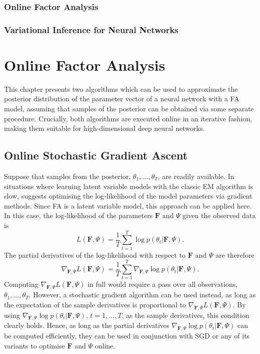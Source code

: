 \documentclass[msc,deptreport.inf]{infthesis} %
\newcommand{\matr}[1]{\mathbf{#1}}
\begin{document}
\subsection{Online Factor Analysis}

\subsection{Variational Inference for Neural Networks}


\chapter{Online Factor Analysis}\label{ch:online_fa}

This chapter presents two algorithms which can be used to approximate the posterior distribution of the parameter vector of a neural network with a FA model, assuming that samples of the posterior can be obtained via some separate procedure. Crucially, both algorithms are executed online in an iterative fashion, making them suitable for high-dimensional deep neural networks.

\section{Online Stochastic Gradient Ascent}\label{sec:gradient_fa}

Suppose that samples from the posterior, $\theta_1,\dots,\theta_T$, are readily available. In situations where learning latent variable models with the classic EM algorithm is slow, \cite{barber2007} suggests optimising the log-likelihood of the model parameters via gradient methods. Since FA is a latent variable model, this approach can be applied here. In this case, the log-likelihood of the parameters $\matr{F}$ and $\Psi$ given the observed data is 
\begin{equation}
	L(\matr{F}, \Psi) = \frac{1}{T} \sum_{t=1}^T \log p(\theta_t | \matr{F}, \Psi).
\end{equation}
The partial derivatives of the log-likelihood with respect to $\matr{F}$ and $\Psi$ are therefore
\begin{equation}
	\nabla_{\matr{F}, \Psi} L(\matr{F}, \Psi) = \frac{1}{T} \sum_{t=1}^T \nabla_{\matr{F}, \Psi} \log p(\theta_t | \matr{F}, \Psi).
\end{equation}
Computing $\nabla_{\matr{F}, \Psi} L(\matr{F}, \Psi)$ in full would require a pass over all observations, $\theta_1, \dots, \theta_T$. However, a stochastic gradient algorithm can be used instead, as long as the expectation of the sample derivatives is proportional to $\nabla_{\matr{F}, \Psi} L(\matr{F}, \Psi)$. By using $\nabla_{\matr{F}, \Psi} \log p(\theta_t | \matr{F}, \Psi)$, $t=1,\dots,T$, as the sample derivatives, this condition clearly holds. Hence, as long as the partial derivatives $\nabla_{\matr{F}, \Psi} \log p(\theta_t | \matr{F}, \Psi)$ can be computed efficiently, they can be used in conjunction with SGD or any of its variants to optimise $\matr{F}$ and $\Psi$ online. 
\end{document}
